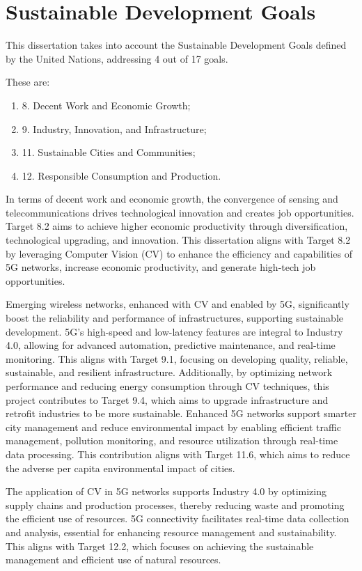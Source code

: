 
\chapter*{Sustainable Development Goals}
This dissertation takes into account the Sustainable Development Goals defined by the United Nations, addressing 4 out of 17 goals.

These are:
\begin{enumerate}[label=]
    \item 8. Decent Work and Economic Growth;
    \item 9. Industry, Innovation, and Infrastructure;
    \item 11. Sustainable Cities and Communities;
    \item 12. Responsible Consumption and Production.
\end{enumerate}

In terms of decent work and economic growth, the convergence of sensing and telecommunications drives technological innovation and creates job opportunities.
Target 8.2 aims to achieve higher economic productivity through diversification, technological upgrading, and innovation.
This dissertation aligns with Target 8.2 by leveraging Computer Vision (CV) to enhance the efficiency and capabilities of 5G networks, increase economic productivity, and generate high-tech job opportunities.

Emerging wireless networks, enhanced with CV and enabled by 5G, significantly boost the reliability and performance of infrastructures, supporting sustainable development.
5G's high-speed and low-latency features are integral to Industry 4.0, allowing for advanced automation, predictive maintenance, and real-time monitoring.
This aligns with Target 9.1, focusing on developing quality, reliable, sustainable, and resilient infrastructure.
Additionally, by optimizing network performance and reducing energy consumption through CV techniques, this project contributes to Target 9.4, which aims to upgrade infrastructure and retrofit industries to be more sustainable.
Enhanced 5G networks support smarter city management and reduce environmental impact by enabling efficient traffic management, pollution monitoring, and resource utilization through real-time data processing.
This contribution aligns with Target 11.6, which aims to reduce the adverse per capita environmental impact of cities.

The application of CV in 5G networks supports Industry 4.0 by optimizing supply chains and production processes, thereby reducing waste and promoting the efficient use of resources.
5G connectivity facilitates real-time data collection and analysis, essential for enhancing resource management and sustainability.
This aligns with Target 12.2, which focuses on achieving the sustainable management and efficient use of natural resources.


